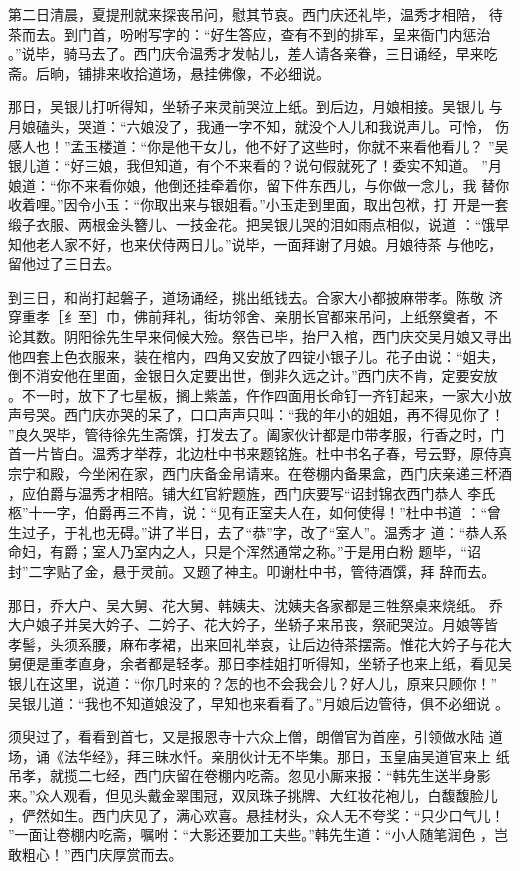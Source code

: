 第二日清晨，夏提刑就来探丧吊问，慰其节哀。西门庆还礼毕，温秀才相陪，
待茶而去。到门首，吩咐写字的：“好生答应，查有不到的排军，呈来衙门内惩治
。”说毕，骑马去了。西门庆令温秀才发帖儿，差人请各亲眷，三日诵经，早来吃
斋。后晌，铺排来收拾道场，悬挂佛像，不必细说。

那日，吴银儿打听得知，坐轿子来灵前哭泣上纸。到后边，月娘相接。吴银儿
与月娘磕头，哭道：“六娘没了，我通一字不知，就没个人儿和我说声儿。可怜，
伤感人也！”孟玉楼道：“你是他干女儿，他不好了这些时，你就不来看他看儿？
”吴银儿道：“好三娘，我但知道，有个不来看的？说句假就死了！委实不知道。
”月娘道：“你不来看你娘，他倒还挂牵着你，留下件东西儿，与你做一念儿，我
替你收着哩。”因令小玉：“你取出来与银姐看。”小玉走到里面，取出包袱，打
开是一套缎子衣服、两根金头簪儿、一技金花。把吴银儿哭的泪如雨点相似，说道
：“饿早知他老人家不好，也来伏侍两日儿。”说毕，一面拜谢了月娘。月娘待茶
与他吃，留他过了三日去。

到三日，和尚打起磐子，道场诵经，挑出纸钱去。合家大小都披麻带孝。陈敬
济穿重孝［纟至］巾，佛前拜礼，街坊邻舍、亲朋长官都来吊问，上纸祭奠者，不
论其数。阴阳徐先生早来伺候大殓。祭告已毕，抬尸入棺，西门庆交吴月娘又寻出
他四套上色衣服来，装在棺内，四角又安放了四锭小银子儿。花子由说：“姐夫，
倒不消安他在里面，金银日久定要出世，倒非久远之计。”西门庆不肯，定要安放
。不一时，放下了七星板，搁上紫盖，仵作四面用长命钉一齐钉起来，一家大小放
声号哭。西门庆亦哭的呆了，口口声声只叫：“我的年小的姐姐，再不得见你了！
”良久哭毕，管待徐先生斋馔，打发去了。阖家伙计都是巾带孝服，行香之时，门
首一片皆白。温秀才举荐，北边杜中书来题铭旌。杜中书名子春，号云野，原侍真
宗宁和殿，今坐闲在家，西门庆备金帛请来。在卷棚内备果盒，西门庆亲递三杯酒
，应伯爵与温秀才相陪。铺大红官紵题旌，西门庆要写“诏封锦衣西门恭人
李氏柩”十一字，伯爵再三不肯，说：“见有正室夫人在，如何使得！”杜中书道
：“曾生过子，于礼也无碍。”讲了半日，去了“恭”字，改了“室人”。温秀才
道：“恭人系命妇，有爵；室人乃室内之人，只是个浑然通常之称。”于是用白粉
题毕，“诏封”二字贴了金，悬于灵前。又题了神主。叩谢杜中书，管待酒馔，拜
辞而去。

那日，乔大户、吴大舅、花大舅、韩姨夫、沈姨夫各家都是三牲祭桌来烧纸。
乔大户娘子并吴大妗子、二妗子、花大妗子，坐轿子来吊丧，祭祀哭泣。月娘等皆
孝髻，头须系腰，麻布孝裙，出来回礼举哀，让后边待茶摆斋。惟花大妗子与花大
舅便是重孝直身，余者都是轻孝。那日李桂姐打听得知，坐轿子也来上纸，看见吴
银儿在这里，说道：“你几时来的？怎的也不会我会儿？好人儿，原来只顾你！”
吴银儿道：“我也不知道娘没了，早知也来看看了。”月娘后边管待，俱不必细说
。

须臾过了，看看到首七，又是报恩寺十六众上僧，朗僧官为首座，引领做水陆
道场，诵《法华经》，拜三昧水忏。亲朋伙计无不毕集。那日，玉皇庙吴道官来上
纸吊孝，就揽二七经，西门庆留在卷棚内吃斋。忽见小厮来报：“韩先生送半身影
来。”众人观看，但见头戴金翠围冠，双凤珠子挑牌、大红妆花袍儿，白馥馥脸儿
，俨然如生。西门庆见了，满心欢喜。悬挂材头，众人无不夸奖：“只少口气儿！
”一面让卷棚内吃斋，嘱咐：“大影还要加工夫些。”韩先生道：“小人随笔润色
，岂敢粗心！”西门庆厚赏而去。

